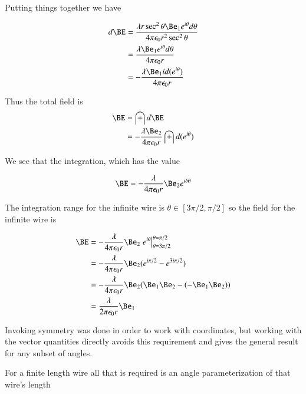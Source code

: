 \documentclass{article}
\begin{document}
Putting things together we have

\begin{align*}
d\BE
&= \frac{\lambda r \sec^2 \theta \Be_1 e^{i\theta} d\theta}{4 \pi \epsilon_0 r^2 \sec^2 \theta} \\
&= \frac{\lambda \Be_1 e^{i\theta} d\theta}{4 \pi \epsilon_0 r} \\
&= -\frac{\lambda \Be_1 i d(e^{i\theta})}{4 \pi \epsilon_0 r} \\
\end{align*}

Thus the total field is
\begin{align*}
\BE
&= \int d\BE \\
&= -\frac{\lambda \Be_2}{4 \pi \epsilon_0 r} \int d(e^{i\theta}) \\
\end{align*}

We see that the integration, which has the value

\begin{align}
\BE = -\frac{\lambda} {4 \pi \epsilon_0 r} \Be_2 e^{i\delta\theta}
\end{align}

The integration range for the infinite wire is $\theta \in [3\pi/2, \pi/2]$
so the field for the infinite wire is

\begin{align*}
\BE
&= -\frac{\lambda} {4 \pi \epsilon_0 r} \Be_2 \left. e^{i\theta} \right\vert^{\theta = \pi/2}_{\theta = 3\pi/2} \\
&= -\frac{\lambda} {4 \pi \epsilon_0 r} \Be_2 (e^{i\pi/2} - e^{3i\pi/2}) \\
&= -\frac{\lambda} {4 \pi \epsilon_0 r} \Be_2 (\Be_1 \Be_2 - (-\Be_1 \Be_2)) \\
&= \frac{\lambda} {2 \pi \epsilon_0 r} \Be_1 \\
\end{align*}


Invoking symmetry was done in order to work with coordinates, but working with the vector quantities directly
avoids this requirement and gives the general result for any subset of angles.

For a finite length wire all that is required is an angle parameterization of that wire's length
\end{document}
